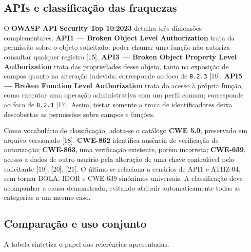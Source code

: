 \subsection{APIs e classificação das
fraquezas}\label{apis-e-classificauxe7uxe3o-das-fraquezas}

O \textbf{OWASP API Security Top 10:2023} detalha três dimensões
complementares. \textbf{API1 --- Broken Object Level Authorization}
trata da permissão sobre o objeto solicitado: poder chamar uma função
não autoriza consultar qualquer registro {[}15{]}. \textbf{API3 ---
Broken Object Property Level Authorization} trata das propriedades desse
objeto, tanto na exposição de campos quanto na alteração indevida;
corresponde ao foco de \texttt{8.2.3} {[}16{]}. \textbf{API5 --- Broken
Function Level Authorization} trata do acesso à própria função, como
executar uma operação administrativa com um perfil comum; corresponde ao
foco de \texttt{8.2.1} {[}17{]}. Assim, testar somente a troca de
identificadores deixa descobertas as permissões sobre campos e funções.

Como vocabulário de classificação, adota-se o catálogo \textbf{CWE 5.0},
preservado em arquivo versionado {[}18{]}. \textbf{CWE-862} identifica
ausência de verificação de autorização; \textbf{CWE-863}, uma
verificação existente, porém incorreta; \textbf{CWE-639}, acesso a dados
de outro usuário pela alteração de uma chave controlável pelo
solicitante {[}19{]}, {[}20{]}, {[}21{]}. O último se relaciona a
cenários de API1 e ATHZ-04, sem tornar BOLA, IDOR e CWE-639 sinônimos
universais. A classificação deve acompanhar a causa demonstrada,
evitando atribuir automaticamente todas as categorias a um mesmo caso.

\subsection{Comparação e uso
conjunto}\label{comparauxe7uxe3o-e-uso-conjunto}

A tabela sintetiza o papel das referências apresentadas.

